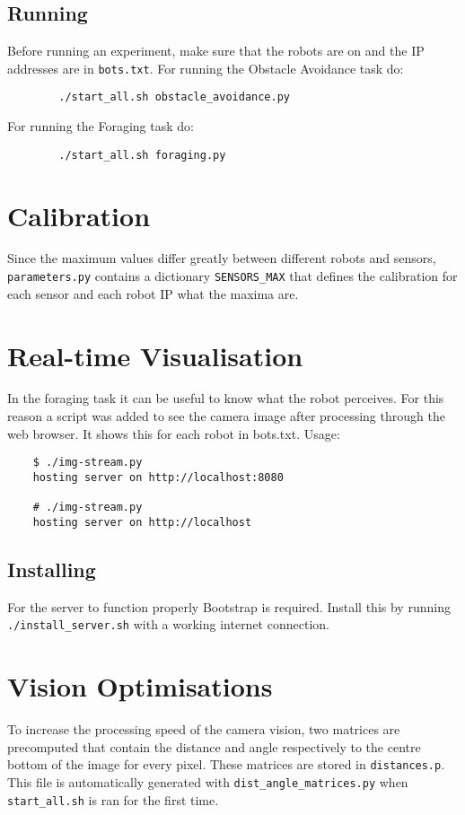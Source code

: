 \documentclass{article}
\begin{document}
	\subsection{Running} %
	\label{apx:sub:running}
	Before running an experiment, make sure that the robots are on and the IP
	addresses are in \texttt{bots.txt}.
	For running the Obstacle Avoidance task do:
	\begin{verbatim}
		./start_all.sh obstacle_avoidance.py
	\end{verbatim}
	For running the Foraging task do:
	\begin{verbatim}
		./start_all.sh foraging.py
	\end{verbatim}

	\section{Calibration} %
	\label{apx:sec:calibration}
	Since the maximum values differ greatly between different robots and
	sensors, \texttt{parameters.py} contains a dictionary \texttt{SENSORS\_MAX}
	that defines the calibration for each sensor and each robot IP what the
	maxima are.

	\section{Real-time Visualisation} %
	\label{apx:sec:visualisation}
	In the foraging task it can be useful to know what the robot perceives. For
	this reason a script was added to see the camera image after processing
	through the web browser. It shows this for each robot in bots.txt. Usage:
	\begin{verbatim}
	$ ./img-stream.py
	hosting server on http://localhost:8080

	# ./img-stream.py
	hosting server on http://localhost
	\end{verbatim}
	\subsection{Installing} %
	\label{apx:sub:install_server}
	For the server to function properly Bootstrap is required. Install this
	by running \texttt{./install\_server.sh} with a working internet
	connection.

	\section{Vision Optimisations} %
	\label{apx:sec:vision_optimisations}
	To increase the processing speed of the camera vision, two matrices are
	precomputed that contain the distance and angle respectively to the centre
	bottom of the image for every pixel.
	These matrices are stored in \texttt{distances.p}. This file is
	automatically generated with \texttt{dist\_angle\_matrices.py} when
	\texttt{start\_all.sh} is ran for the first time.
\end{document}
